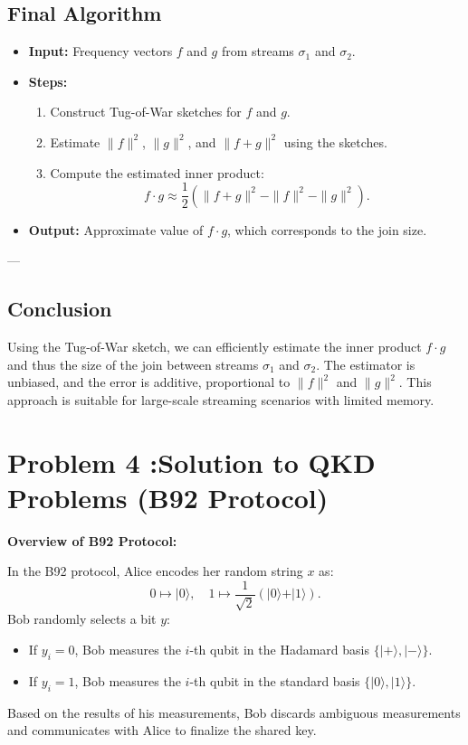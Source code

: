 \documentclass[12pt,letterpaper]{article}
\begin{document}
\subsection*{Final Algorithm}

\begin{itemize}
    \item \textbf{Input:} Frequency vectors \( f \) and \( g \) from streams \( \sigma_1 \) and \( \sigma_2 \).
    \item \textbf{Steps:}
    \begin{enumerate}
        \item Construct Tug-of-War sketches for \( f \) and \( g \).
        \item Estimate \( \|f\|^2 \), \( \|g\|^2 \), and \( \|f + g\|^2 \) using the sketches.
        \item Compute the estimated inner product:
        \[
        f \cdot g \approx \frac{1}{2}\left(\|f + g\|^2 - \|f\|^2 - \|g\|^2\right).
        \]
    \end{enumerate}
    \item \textbf{Output:} Approximate value of \( f \cdot g \), which corresponds to the join size.
\end{itemize}

---

\subsection*{Conclusion}

Using the Tug-of-War sketch, we can efficiently estimate the inner product \( f \cdot g \) and thus the size of the join between streams \( \sigma_1 \) and \( \sigma_2 \). The estimator is unbiased, and the error is additive, proportional to \( \|f\|^2 \) and \( \|g\|^2 \). This approach is suitable for large-scale streaming scenarios with limited memory.




\section*{Problem 4 :Solution to QKD Problems (B92 Protocol)}

\textbf{Overview of B92 Protocol:}

In the B92 protocol, Alice encodes her random string \( x \) as:
\[
0 \mapsto \vert 0 \rangle, \quad 1 \mapsto \frac{1}{\sqrt{2}}(\vert 0 \rangle + \vert 1 \rangle).
\]
Bob randomly selects a bit \( y \):
\begin{itemize}
    \item If \( y_i = 0 \), Bob measures the \( i \)-th qubit in the Hadamard basis \(\{\vert + \rangle, \vert - \rangle\}\).
    \item If \( y_i = 1 \), Bob measures the \( i \)-th qubit in the standard basis \(\{\vert 0 \rangle, \vert 1 \rangle\}\).
\end{itemize}
Based on the results of his measurements, Bob discards ambiguous measurements and communicates with Alice to finalize the shared key.
\end{document}
